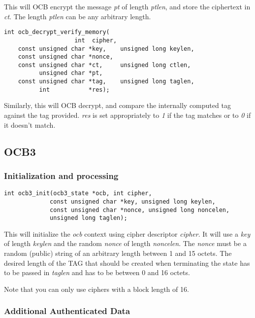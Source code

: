 \documentclass[synpaper]{book}
\begin{document}
This will OCB encrypt the message \textit{pt} of length \textit{ptlen}, and store the ciphertext in \textit{ct}.  The length \textit{ptlen}
can be any arbitrary length.

\begin{verbatim}
int ocb_decrypt_verify_memory(
                    int  cipher,
    const unsigned char *key,    unsigned long keylen,
    const unsigned char *nonce,
    const unsigned char *ct,     unsigned long ctlen,
          unsigned char *pt,
    const unsigned char *tag,    unsigned long taglen,
          int           *res);
\end{verbatim}

Similarly, this will OCB decrypt, and compare the internally computed tag against the tag provided. \textit{res} is set
appropriately to \textit{1} if the tag matches or to \textit{0} if it doesn't match.

\subsection{OCB3}
\subsubsection{Initialization and processing}

\begin{verbatim}
int ocb3_init(ocb3_state *ocb, int cipher,
             const unsigned char *key, unsigned long keylen,
             const unsigned char *nonce, unsigned long noncelen,
             unsigned long taglen);
\end{verbatim}

This will initialize the \textit{ocb} context using cipher descriptor \textit{cipher}.  It will use a \textit{key} of length \textit{keylen}
and the random \textit{nonce} of length \textit{noncelen}.  The \textit{nonce} must be a random (public) string of an arbitrary length
between 1 and 15 octets.  The desired length of the TAG that should be created when terminating the state has to be passed in \textit{taglen}
and has to be between 0 and 16 octets.

Note that you can only use ciphers with a block length of 16.

\subsubsection{Additional Authenticated Data}
\end{document}
